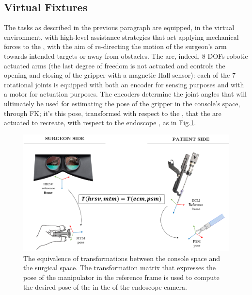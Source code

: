 \documentclass[../main.tex]{subfiles}
\begin{document}
\subsection{Virtual Fixtures}
The tasks as described in the previous paragraph are equipped, in the virtual environment, with high-level assistance strategies that act applying mechanical forces to the \mtms, with the aim of re-directing the motion of the surgeon's arm towards intended targets or away from obstacles. The \mtms are, indeed, 8-DOFs robotic actuated arms (the last degree of freedom is not actuated and controls the opening and closing of the gripper with a magnetic Hall sensor): each of the 7 rotational joints is equipped with both an encoder for sensing purposes and with a motor for actuation purposes. The encoders determine the joint angles that will ultimately be used for estimating the pose of the gripper in the console's space, through FK; it's this pose, transformed with respect to the \hrsv \rf, that the \psms are actuated to recreate, with respect to the endoscope \rf, as in Fig.\ref{fig:consoletocarttransform}. 

\begin{figure}[h]
    \centering
    \includegraphics[width=\textwidth]{images/console_to_cart_transform.png}
    \caption{The equivalence of transformations between the console space and the surgical space. The transformation matrix that expresses the pose of the manipulator in the \hrsv reference frame is used to compute the desired pose of the \psm in the \rf of the endoscope camera.}
    \label{fig:consoletocarttransform}
\end{figure}
\end{document}
